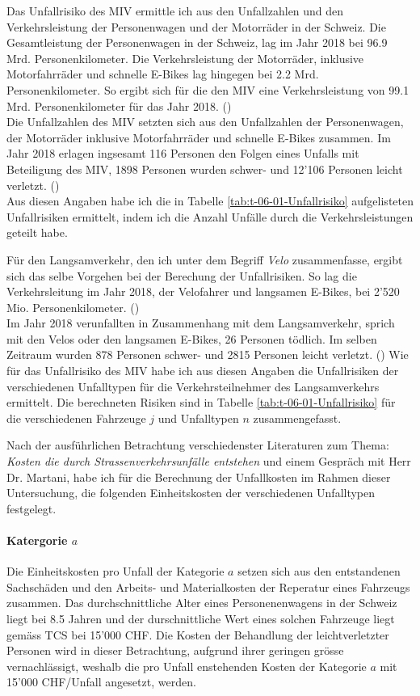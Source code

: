 Das Unfallrisiko des MIV ermittle ich aus den Unfallzahlen und den Verkehrsleistung der Personenwagen und der Motorräder in der Schweiz. Die Gesamtleistung der Personenwagen in der Schweiz, lag im Jahr 2018 bei 96.9 Mrd. Personenkilometer. Die Verkehrsleistung der Motorräder, inklusive Motorfahrräder und schnelle E-Bikes lag hingegen bei 2.2 Mrd. Personenkilometer. So ergibt sich für die den MIV eine Verkehrsleistung von 99.1 Mrd. Personenkilometer für das Jahr 2018. (\cite{Verkehrsleistung2019})\\
Die Unfallzahlen des MIV setzten sich aus den Unfallzahlen der Personenwagen, der Motorräder inklusive Motorfahrräder und schnelle E-Bikes zusammen. Im Jahr 2018 erlagen ingsesamt 116 Personen den Folgen eines Unfalls mit Beteiligung des MIV, 1898 Personen wurden schwer- und 12'106 Personen leicht verletzt. (\cite{Unfall2019})\\
Aus diesen Angaben habe ich die in Tabelle \ref{tab:t-06-01-Unfallrisiko} aufgelisteten Unfallrisiken ermittelt, indem ich die Anzahl Unfälle durch die Verkehrsleistungen geteilt habe.

Für den Langsamverkehr, den ich unter dem Begriff \textit{Velo} zusammenfasse, ergibt sich das selbe Vorgehen bei der Berechung der Unfallrisiken. So lag die Verkehrsleitung im Jahr 2018, der Velofahrer und langsamen E-Bikes, bei 2'520 Mio. Personenkilometer. (\cite{Verkehrsleistung2019}) \\
Im Jahr 2018 verunfallten in Zusammenhang mit dem Langsamverkehr, sprich mit den Velos oder den langsamen E-Bikes, 26 Personen tödlich. Im selben Zeitraum wurden 878 Personen schwer- und 2815 Personen leicht verletzt. (\cite{Unfall2019})
Wie für das Unfallrisiko des MIV habe ich aus diesen Angaben die Unfallrisiken der verschiedenen Unfalltypen für die Verkehrsteilnehmer des Langsamverkehrs ermittelt. Die berechneten Risiken sind in Tabelle \ref{tab:t-06-01-Unfallrisiko} für die verschiedenen Fahrzeuge $j$ und Unfalltypen $n$ zusammengefasst.




Nach der ausführlichen Betrachtung verschiedenster Literaturen zum Thema: \textit{Kosten die durch Strassenverkehrsunfälle entstehen} und einem Gespräch mit Herr Dr. Martani, habe ich für die Berechnung der Unfallkosten im Rahmen dieser Untersuchung, die folgenden Einheitskosten der verschiedenen Unfalltypen festgelegt.

\paragraph{Katergorie $a$} Die Einheitskosten pro Unfall der Kategorie $a$ setzen sich aus den entstandenen Sachschäden und den Arbeits- und Materialkosten der Reperatur eines Fahrzeugs zusammen. Das durchschnittliche Alter eines Personenenwagens in der Schweiz liegt bei 8.5 Jahren und der durschnittliche Wert eines solchen Fahrzeuge liegt gemäss TCS bei 15'000 CHF. Die Kosten der Behandlung der leichtverletzter Personen wird in dieser Betrachtung, aufgrund ihrer geringen grösse vernachlässigt, weshalb die pro Unfall enstehenden Kosten der Kategorie $a$ mit 15'000 CHF/Unfall angesetzt, werden.


